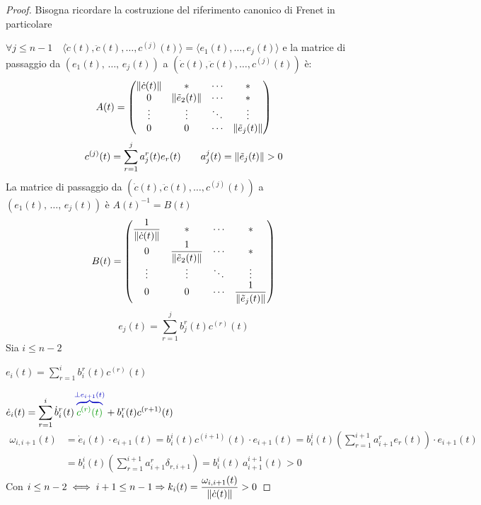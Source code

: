         \begin{proof}
        \mbox{}

        Bisogna ricordare la costruzione del riferimento canonico di Frenet in particolare 
        
        $\forall j \leq n-1 \quad \langle \dot{c}(t), \ddot{c}(t), \dots, c^{(j)}(t) \rangle = \langle e_1(t), \dots, e_j(t) \rangle$
        e la matrice di passaggio da $\left(e_1(t), \, \dots, \, e_j(t)\right)$ a $ \left(\dot{c}(t), \ddot{c}(t), \dots, c^{(j)}(t)\right)$ è:
        \[ A(t) =
        \begin{pmatrix}
        \lVert\dot{c}(t)\rVert & * & \cdots & * \\
        0 & \lVert\tilde{e}_2(t)\rVert & \cdots & * \\
        \vdots & \vdots & \ddots & \vdots \\
        0 & 0 & \cdots & \lVert\tilde{e}_j(t)\rVert
        \end{pmatrix}
        \]
        \[ c^{(j)}(t) = \sum_{r=1}^{j} a_j^r (t) e_r(t) \qquad a_j^j(t) = \lVert\tilde{e}_j(t)\rVert> 0 \]
        La matrice di passaggio da $ \left(\dot{c}(t), \ddot{c}(t), \dots, c^{(j)}(t)\right)$ a $\left(e_1(t), \, \dots, \, e_j(t)\right)$ è $A(t)^{-1}=B(t)$
        \[ B(t) =
        \begin{pmatrix}
        \dfrac{1}{\lVert\dot{c}(t)\rVert} & * & \cdots & * \\
        0 & \dfrac{1}{\lVert\tilde{e}_2(t)\rVert} & \cdots & * \\
        \vdots & \vdots & \ddots & \vdots \\
        0 & 0 & \cdots & \dfrac{1}{\lVert\tilde{e}_j(t)\rVert}
        \end{pmatrix}
        \]
        \[ e_j(t) = \sum_{r=1}^{j} b_j^r(t) c^{(r)}(t) \]
        Sia $i \leq n-2$ 
        
        $\displaystyle e_i(t) = \sum_{r=1}^{i} b_i^r(t) c^{(r)}(t)$

        $\displaystyle \dot{e}_i(t) = \sum_{r=1}^{i} \dot{b}_i^r(t) \textcolor{blu}{\overbrace{\textcolor{verde}{c^{(r)}(t)}}^{\perp e_{i+1}(t)}} + b_i^r(t) c^{(r+1)}(t)$
        \begin{align*}
        \omega_{i,i+1} (t) &= \dot{e}_i(t) \cdot e_{i+1}(t) = b_i^i(t) c^{(i+1)}(t) \cdot e_{i+1}(t) = b_i^i(t) \left(\sum_{r=1}^{i+1} a_{i+1}^r e_r(t)\right) \cdot e_{i+1}(t) \\
        &= b_i^i (t) \left(\sum_{r=1}^{i+1} a_{i+1}^r \delta_{r,i+1} \right) = b_i^i(t) \, a_{i+1}^{i+1}(t)>0 
        \end{align*}
        Con $\displaystyle i \leq n-2 \iff i+1 \leq n-1 \Rightarrow k_i(t) = \frac{\omega_{i,i+1}(t)}{\lVert\dot{c}(t)\rVert} >0$ 
        \end{proof}
